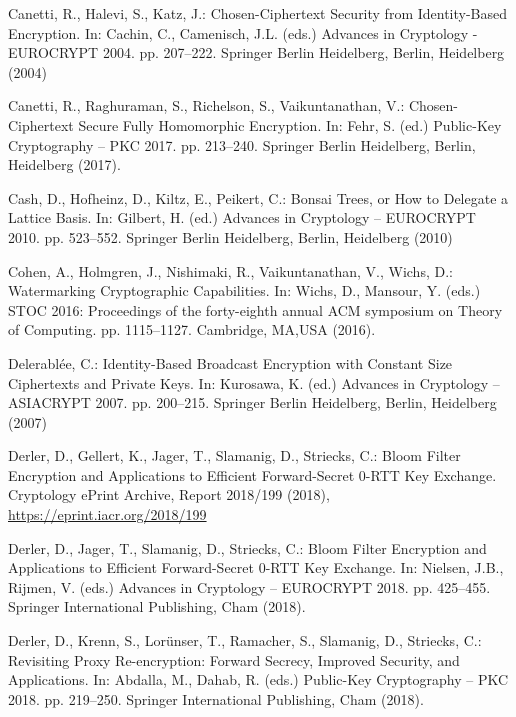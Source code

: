 \documentclass[runningheads,10pt]{llncs}
\begin{document}
\begin{thebibliography}{10}
	Canetti, R., Halevi, S., Katz, J.: {{Chosen-Ciphertext Security from
			Identity-Based Encryption}}. In: Cachin, C., Camenisch, J.L. (eds.) Advances
	in Cryptology - EUROCRYPT 2004. pp. 207--222. Springer Berlin Heidelberg,
	Berlin, Heidelberg (2004)
	
	Canetti, R., Raghuraman, S., Richelson, S., Vaikuntanathan, V.:
	{Chosen-Ciphertext Secure Fully Homomorphic Encryption}. In: Fehr, S. (ed.)
	Public-Key Cryptography -- PKC 2017. pp. 213--240. Springer Berlin
	Heidelberg, Berlin, Heidelberg (2017). 
	
	Cash, D., Hofheinz, D., Kiltz, E., Peikert, C.: {Bonsai Trees, or How to
		Delegate a Lattice Basis}. In: Gilbert, H. (ed.) Advances in Cryptology --
	EUROCRYPT 2010. pp. 523--552. Springer Berlin Heidelberg, Berlin, Heidelberg
	(2010)
	
	Cohen, A., Holmgren, J., Nishimaki, R., Vaikuntanathan, V., Wichs, D.:
	{{Watermarking Cryptographic Capabilities}}. In: Wichs, D., Mansour, Y.
	(eds.) STOC 2016: Proceedings of the forty-eighth annual ACM symposium on
	Theory of Computing. pp. 1115--1127. Cambridge, MA,USA (2016).
	
	Delerabl{\'e}e, C.: {Identity-Based Broadcast Encryption with Constant Size
		Ciphertexts and Private Keys}. In: Kurosawa, K. (ed.) Advances in Cryptology
	-- ASIACRYPT 2007. pp. 200--215. Springer Berlin Heidelberg, Berlin,
	Heidelberg (2007)
	
	Derler, D., Gellert, K., Jager, T., Slamanig, D., Striecks, C.: {Bloom Filter
		Encryption and Applications to Efficient Forward-Secret 0-RTT Key Exchange}.
	Cryptology ePrint Archive, Report 2018/199 (2018),
	\url{https://eprint.iacr.org/2018/199}
	
	Derler, D., Jager, T., Slamanig, D., Striecks, C.: {{Bloom Filter Encryption
			and Applications to Efficient Forward-Secret 0-RTT Key Exchange}}. In:
	Nielsen, J.B., Rijmen, V. (eds.) Advances in Cryptology -- EUROCRYPT 2018.
	pp. 425--455. Springer International Publishing, Cham (2018).
	
	Derler, D., Krenn, S., Lor{\"u}nser, T., Ramacher, S., Slamanig, D., Striecks,
	C.: {{Revisiting Proxy Re-encryption: Forward Secrecy, Improved Security, and
			Applications}}. In: Abdalla, M., Dahab, R. (eds.) Public-Key Cryptography --
	PKC 2018. pp. 219--250. Springer International Publishing, Cham (2018).
	

\end{thebibliography}
\end{document}
